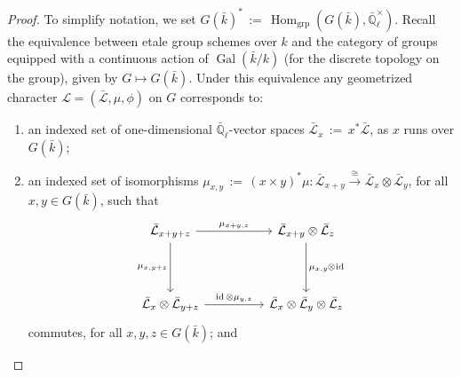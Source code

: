 \documentclass[11pt]{amsart}
\makeatletter
\theoremstyle{plain}
\theoremstyle{definition}
\theoremstyle{remark}
\newcommand{\EE}{\mathbb{\bar Q}_\ell}
\newcommand{\bFq}{\bar{k}}
\newcommand{\Fq}{k}
\newcommand{\EEx}{\EE^\times}
\DeclareMathOperator{\Gal}{Gal}
\DeclareMathOperator{\Hom}{Hom}
\DeclareMathOperator{\id}{id}
\newcommand{\ceq}{{\, :=\, }}
\newcommand{\iso}{{\ \cong\ }}
\newcommand{\cs}[1]{{\mathcal{#1}}}
\newcommand{\gcs}[1]{{\mathcal{\bar #1}}}
\newcommand{\labitem}[2]{%
\def\@itemlabel{\textbf{#1}}
\item
\def\@currentlabel{#1}\label{#2}}
\newcommand{\tight}[3]{\hspace{-#1pt}{#2}\hspace{-#3pt}}
\makeatother
\begin{document}
\begin{proof}
  To simplify notation, we set
  $G(\bFq)^* \ceq \Hom_\text{grp}(G(\bFq),\EEx)$.  Recall the
  equivalence between etale group schemes over $\Fq$ and the category
  of groups equipped with a continuous action of $\Gal(\bFq/\Fq)$ (for
  the discrete topology on the group), given by $G \mapsto G(\bFq)$.
  Under this equivalence any geometrized character $\cs{L}=(\gcs{L},\mu,\phi)$
  on $G$ corresponds to:
  \begin{enumerate}
  \labitem{(cs.0)}{cs.0} an indexed set of one-dimensional
    $\EE$-vector spaces $\gcs{L}_x \ceq x^*\gcs{L}$, as $x$ runs over
    $G(\bFq)$;

  \labitem{(cs.1)}{cs.1} an indexed set of isomorphisms
    $\mu_{x,y} \ceq (x \times y)^*\mu : \gcs{L}_{x+y} \mathop{\longrightarrow}\limits^{\iso} \gcs{L}_{x} \otimes \gcs{L}_{y}$,
    for all $x,y \in G(\bFq)$, such that
    \[
    \begin{tikzcd}[row sep=40]
      \gcs{L}_{x+y+z} \arrow{rr}{\mu_{x+y,z}} \arrow[swap]{d}{\mu_{x,y+z}}
      && \gcs{L}_{x+y}\otimes \gcs{L}_{z} \dar{\mu_{x,y} \tight{0.5}{\otimes}{1} \id} \\
      \gcs{L}_{x} \otimes \gcs{L}_{y+z} \arrow{rr}{\id \otimes \mu_{y,z}}
      && \gcs{L}_{x} \otimes\gcs{L}_{y} \otimes \gcs{L}_{z}
    \end{tikzcd}
    \]
    commutes, for all $x,y,z\in G(\bFq)$; and


\end{enumerate}
\end{proof}
\end{document}

